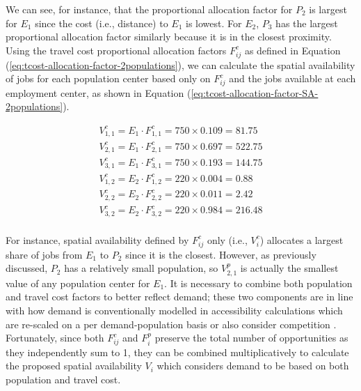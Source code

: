 \documentclass[]{elsarticle} %
\begin{document}
We can see, for instance, that the proportional allocation factor for
\(P_2\) is largest for \(E_1\) since the cost (i.e., distance) to
\(E_1\) is lowest. For \(E_2\), \(P_3\) has the largest proportional
allocation factor similarly because it is in the closest proximity.
Using the travel cost proportional allocation factors \(F^c_{ij}\) as
defined in Equation (\ref{eq:tcost-allocation-factor-2populations}), we
can calculate the spatial availability of jobs for each population
center based only on \(F^c_{ij}\) and the jobs available at each
employment center, as shown in Equation
(\ref{eq:tcost-allocation-factor-SA-2populations}).

\begin{equation}
\label{eq:tcost-allocation-factor-SA-2populations}
\begin{array}{l}
V^c_{1,1} = E_1 \cdot F^c_{1,1} = 750 \times 0.109 = 81.75\\
V^c_{2,1} = E_1 \cdot F^c_{2,1} = 750 \times  0.697 = 522.75\\
V^c_{3,1} = E_1 \cdot F^c_{3,1} = 750 \times  0.193 = 144.75\\
V^c_{1,2} = E_2 \cdot F^c_{1,2} = 220 \times 0.004 = 0.88\\
V^c_{2,2} = E_2 \cdot F^c_{2,2} = 220 \times  0.011 = 2.42\\
V^c_{3,2} = E_2 \cdot F^c_{3,2} = 220 \times  0.984 = 216.48\\
\end{array}
\end{equation}

For instance, spatial availability defined by \(F^c_{ij}\) only (i.e.,
\(V^c_{i}\)) allocates a largest share of jobs from \(E_1\) to \(P_2\)
since it is the closest. However, as previously discussed, \(P_2\) has a
relatively small population, so \(V^p_{2,1}\) is actually the smallest
value of any population center for \(E_1\). It is necessary to combine
both population and travel cost factors to better reflect demand; these
two components are in line with how demand is conventionally modelled in
accessibility calculations which are re-scaled on a per
demand-population basis or also consider competition
\citep[e.g.,][]{allen2019, barboza_balancing_2021, yang_comparing_2006}.
Fortunately, since both \(F^c_{ij}\) and \(F^p_{i}\) preserve the total
number of opportunities as they independently sum to 1, they can be
combined multiplicatively to calculate the proposed spatial availability
\(V_{i}\) which considers demand to be based on both population and
travel cost.
\end{document}

